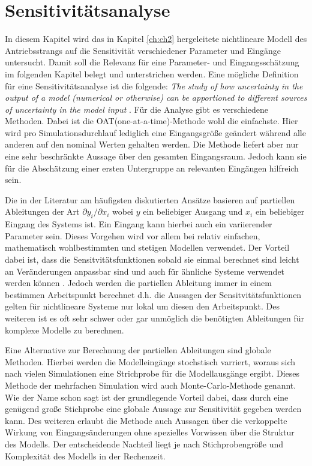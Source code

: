 \chapter{Sensitivitätsanalyse}\label{ch:Sensitivity}
In diesem Kapitel wird das in Kapitel \ref{ch:ch2} hergeleitete nichtlineare Modell des Antriebsstrangs auf die Sensitivität verschiedener Parameter und Eingänge untersucht. Damit soll die Relevanz für eine Parameter- und Eingangsschätzung im folgenden Kapitel belegt und unterstrichen werden.
Eine mögliche Definition für eine Sensitivitätsanalyse ist die folgende: \emph{The study of how uncertainty in the output of a model (numerical or otherwise) can be apportioned to different sources of uncertainty in the model input} \cite{Saltelli.2004}.
Für die Analyse gibt es verschiedene Methoden. Dabei ist die OAT(one-at-a-time)-Methode wohl die einfachste. Hier wird pro Simulationsdurchlauf lediglich eine Eingangsgröße geändert während alle anderen auf den nominal Werten gehalten werden. Die Methode liefert aber nur eine sehr beschränkte Aussage über den gesamten Eingangsraum. Jedoch kann sie für die Abschätzung einer ersten Untergruppe an relevanten Eingängen hilfreich sein.    

 Die in der Literatur am häufigsten diskutierten Ansätze basieren auf partiellen Ableitungen der Art $\partial y_i/\partial x_i$ wobei $y$ ein beliebiger Ausgang und $x_i$ ein beliebiger Eingang des Systems ist. Ein Eingang kann hierbei auch ein variierender Parameter sein. Dieses Vorgehen wird vor allem bei relativ einfachen, mathematisch wohlbestimmten und stetigen Modellen verwendet. Der Vorteil dabei ist, dass die Sensitvitätsfunktionen sobald sie einmal berechnet sind leicht an Veränderungen anpassbar sind und auch für ähnliche Systeme verwendet werden können \cite{Karnavas.1993}. Jedoch werden die partiellen Ableitung immer in einem bestimmen Arbeitspunkt berechnet d.h. die Aussagen der Sensitvitätsfunktionen gelten für nichtlineare Systeme nur lokal um diesen den Arbeitspunkt. Des weiteren ist es oft sehr schwer oder gar unmöglich die benötigten Ableitungen für komplexe Modelle zu berechnen.

Eine Alternative zur Berechnung der partiellen Ableitungen sind globale Methoden. Hierbei werden die Modelleingänge stochstisch varriert, woraus sich nach vielen Simulationen eine Strichprobe für die Modellausgänge ergibt. Dieses Methode der mehrfachen Simulation wird auch Monte-Carlo-Methode genannt. Wie der Name schon sagt ist der grundlegende Vorteil dabei, dass durch eine genügend große Stichprobe eine globale Aussage zur Sensitivität gegeben werden kann. Des weiteren erlaubt die Methode auch Aussagen über die verkoppelte Wirkung von Eingangsänderungen ohne spezielles Vorwissen über die Struktur des Modells. Der entscheidende Nachteil liegt je nach Stichprobengröße und Komplexität des Modells in der Rechenzeit.      

